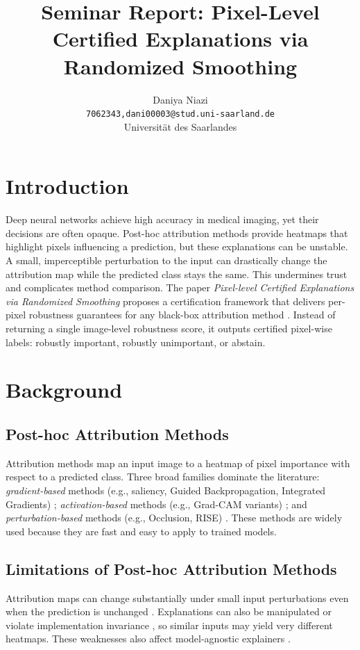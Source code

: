 \documentclass[11pt]{article}
\title{Seminar Report: Pixel-Level Certified Explanations via Randomized Smoothing}
\author{Daniya Niazi \\
\texttt{7062343,dani00003@stud.uni-saarland.de} \\
Universit{\"a}t des Saarlandes}
\date{}
\begin{document}
\maketitle
% 

\section{Introduction}
Deep neural networks achieve high accuracy in medical imaging, yet their decisions are often opaque. Post-hoc attribution methods provide heatmaps that highlight pixels influencing a prediction, but these explanations can be unstable. A small, imperceptible perturbation to the input can drastically change the attribution map while the predicted class stays the same. This undermines trust and complicates method comparison. The paper \emph{Pixel-level Certified Explanations via Randomized Smoothing} proposes a certification framework that delivers per-pixel robustness guarantees for any black-box attribution method \cite{anani2025pixel}. Instead of returning a single image-level robustness score, it outputs certified pixel-wise labels: robustly important, robustly unimportant, or abstain.

\section{Background}
\subsection{Post-hoc Attribution Methods}
Attribution methods map an input image to a heatmap of pixel importance with respect to a predicted class. Three broad families dominate the literature: \textit{gradient-based} methods (e.g., saliency, Guided Backpropagation, Integrated Gradients) \cite{simonyan2014saliency,springenberg2014guided,sundararajan2017integrated}; \textit{activation-based} methods (e.g., Grad-CAM variants) \cite{selvaraju2017gradcam}; and \textit{perturbation-based} methods (e.g., Occlusion, RISE) \cite{zeiler2014occlusion,petsiuk2018rise}. These methods are widely used because they are fast and easy to apply to trained models.

\subsection{Limitations of Post-hoc Attribution Methods}
Attribution maps can change substantially under small input perturbations even when the prediction is unchanged \cite{ghorbani2019fragile,dombrowski2019explanations}. Explanations can also be manipulated or violate implementation invariance \cite{subramanya2019fooling,kindermans2019reliability}, so similar inputs may yield very different heatmaps. These weaknesses also affect model-agnostic explainers \cite{kuppa2020blackbox,carmichael2023unfooling}.
\end{document}
